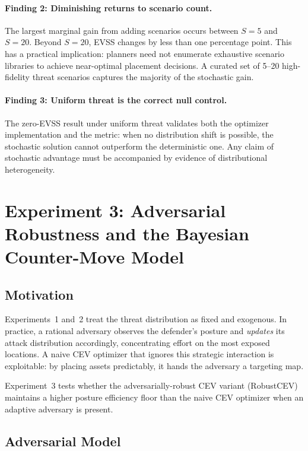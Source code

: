 \documentclass[11pt]{article}
\begin{document}
\paragraph{Finding 2: Diminishing returns to scenario count.}
The largest marginal gain from adding scenarios occurs between $S = 5$
and $S = 20$.  Beyond $S = 20$, EVSS changes by less than one percentage
point.  This has a practical implication: planners need not enumerate
exhaustive scenario libraries to achieve near-optimal placement decisions.
A curated set of 5--20 high-fidelity threat scenarios captures the
majority of the stochastic gain.

\paragraph{Finding 3: Uniform threat is the correct null control.}
The zero-EVSS result under uniform threat validates both the optimizer
implementation and the metric: when no distribution shift is possible,
the stochastic solution cannot outperform the deterministic one.
Any claim of stochastic advantage must be accompanied by evidence of
distributional heterogeneity.


\section{Experiment 3: Adversarial Robustness and the Bayesian Counter-Move Model}
\label{sec:exp3}

\subsection{Motivation}

Experiments~1 and~2 treat the threat distribution as fixed and exogenous.
In practice, a rational adversary observes the defender's posture and
\emph{updates} its attack distribution accordingly, concentrating
effort on the most exposed locations.  A naive CEV optimizer that
ignores this strategic interaction is exploitable: by placing assets
predictably, it hands the adversary a targeting map.

Experiment~3 tests whether the adversarially-robust CEV variant
(RobustCEV) maintains a higher posture efficiency floor than the naive
CEV optimizer when an adaptive adversary is present.

\subsection{Adversarial Model}
\label{sec:exp3:model}
\end{document}
